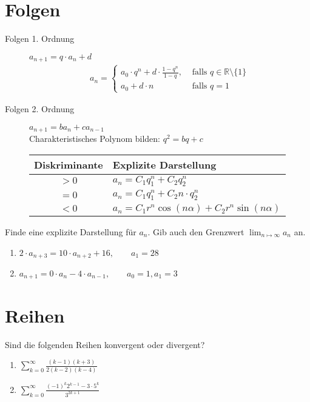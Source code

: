 \documentclass[11pt, a4paper]{article}
\begin{document}
\section{Folgen}
\begin{description}
	\item[Folgen 1. Ordnung] $a_{n+1} = q \cdot a_n + d$
		\begin{align*}
			a_n = \begin{cases}
				a_0 \cdot q^n + d \cdot \frac{1-q^n}{1-q}, &\text{ falls } q \in \mathbb{R} \setminus \{1\} \\
				a_0 + d \cdot n &\text{ falls } q=1
					\end{cases}
		\end{align*}
	\item[Folgen 2. Ordnung] $a_{n+1} = b a_n + c a_{n-1}$ \vspace{0.3cm} \\
		Charakteristisches Polynom bilden: $q^2 = bq+c$ \vspace{0.3cm} \\
		\begin{tabular}{|c|l|}
			\hline
			Diskriminante & Explizite Darstellung \\ \hline
			$>0$ & $a_n = C_1 q_1^n + C_2 q_2^n$ \\
			$=0$ & $a_n = C_1 q_1^n + C_2 n \cdot q_2^n$ \\
			$<0$ & $a_n = C_1 r^n \cos(n\alpha) + C_2 r^n \sin(n\alpha)$ \\ \hline
		\end{tabular}
\end{description}
Finde eine explizite Darstellung für $a_n$. Gib auch den Grenzwert $\displaystyle\lim_{n \mapsto \infty} a_n$ an.
\begin{enumerate}
	\item $2 \cdot a_{n+3} = 10 \cdot a_{n+2} + 16, \qquad a_1 = 28$
	\item $a_{n+1} = 0 \cdot a_n - 4 \cdot a_{n-1}, \qquad a_0 = 1, a_1 = 3$
\end{enumerate}

\section{Reihen}
Sind die folgenden Reihen konvergent oder divergent?
\begin{enumerate}
	\item $\displaystyle \sum_{k=0}^\infty \frac{(k-1)(k+3)}{2(k-2)(k-4)}$
	\item $\displaystyle \sum_{k=0}^\infty \frac{(-1)^k 2^{k-1} - 3 \cdot 5^k}{3^{2k+1}}$
\end{enumerate}
\end{document}
